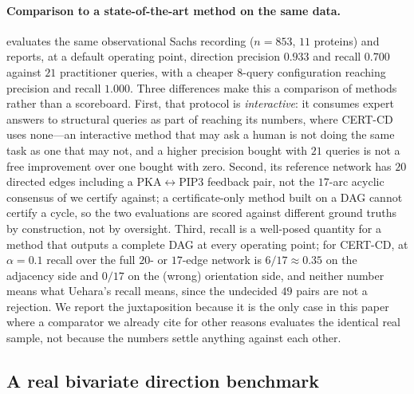 \paragraph{Comparison to a state-of-the-art method on the same data.} \citet{uehara2026iterative}
evaluates the same observational Sachs recording ($n=853$, $11$ proteins) and
reports, at a default operating point, direction precision $0.933$ and recall
$0.700$ against $21$ practitioner queries, with a cheaper $8$-query
configuration reaching precision and recall $1.000$. Three differences make
this a comparison of methods rather than a scoreboard. First, that protocol
is \emph{interactive}: it consumes expert answers to structural queries as
part of reaching its numbers, where CERT-CD uses none---an interactive method
that may ask a human is not doing the same task as one that may not, and a
higher precision bought with $21$ queries is not a free improvement over one
bought with zero. Second, its reference network has $20$ directed edges
including a PKA$\leftrightarrow$PIP3 feedback pair, not the $17$-arc acyclic
consensus of \citet{sachs2005causal} we certify against; a certificate-only
method built on a DAG cannot certify a cycle, so the two evaluations are
scored against different ground truths by construction, not by oversight.
Third, recall is a well-posed quantity for a method that outputs a complete
DAG at every operating point; for CERT-CD, at $\alpha=0.1$ recall over the
full $20$- or $17$-edge network is $6/17 \approx 0.35$ on the adjacency side
and $0/17$ on the (wrong) orientation side, and neither number means what
Uehara's recall means, since the undecided $49$ pairs are not a rejection.
We report the juxtaposition because it is the only case in this paper where a
comparator we already cite for other reasons evaluates the identical real
sample, not because the numbers settle anything against each other.

\subsection{A real bivariate direction benchmark}\label{sec:exp-tuebingen}

